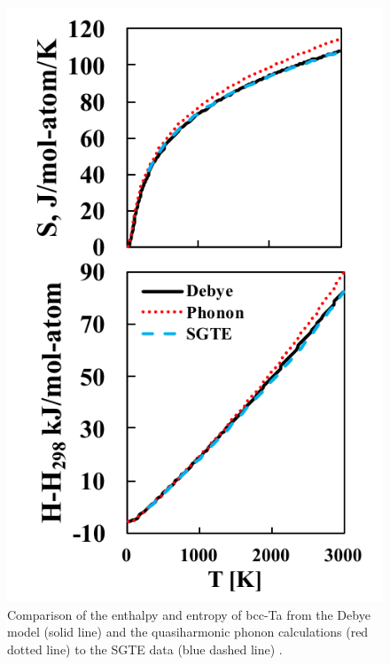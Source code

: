 \pagebreak
\begin{figure}[H]
	\centering
	\includegraphics[scale=1.0]{Chapter-4/Figures/Tafinitetemp.pdf}
	\caption{Comparison of the enthalpy and entropy of bcc-Ta from the Debye model (solid line) and the quasiharmonic phonon calculations (red dotted line) to the SGTE data (blue dashed line) \cite{Dinsdale1991}.}
	\label{Ch4-figure:Tafinitetemp}
\end{figure}

